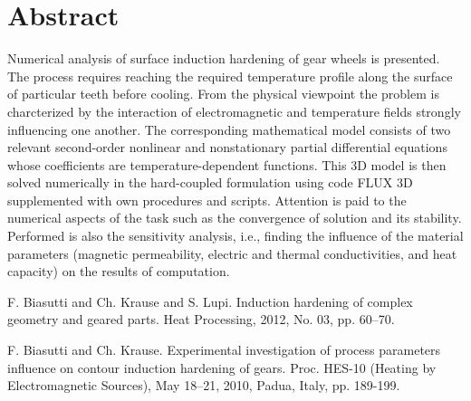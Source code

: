 \documentclass[article, A4, 11pt]{llncs}%
\begin{document}
\section*{Abstract}
Numerical analysis of surface induction hardening of gear wheels is presented. The process requires reaching the required temperature profile along the surface of particular teeth before cooling. From the physical viewpoint the problem is charcterized by the interaction of electromagnetic and temperature fields strongly influencing one another. The corresponding mathematical model consists of two relevant second-order nonlinear and nonstationary partial differential equations whose coefficients are temperature-dependent functions. This 3D model is then solved numerically in the hard-coupled formulation using code FLUX 3D supplemented with own procedures and scripts. Attention is paid to the numerical aspects of the task such as the convergence of solution and its stability. Performed is also the sensitivity analysis, i.e., finding the influence of the material parameters (magnetic permeability, electric and thermal conductivities, and heat capacity) on the results of computation.



\begin{thebibliography}{10}
{\sc F. Biasutti and Ch. Krause and S. Lupi}. {Induction hardening of complex geometry and geared parts}. Heat Processing, 2012, No. 03, pp. 60–70.

{\sc F. Biasutti and Ch. Krause}. {Experimental investigation of process parameters influence on contour induction hardening of gears}. Proc. HES-10 (Heating by Electromagnetic Sources), May 18–21, 2010, Padua, Italy, pp. 189-199.
\end{thebibliography} %
\end{document}
